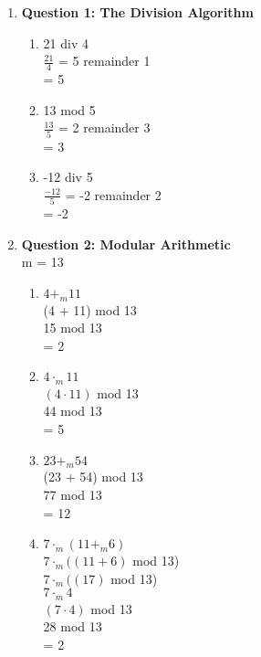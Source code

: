 \documentclass[11pt]{article}
\begin{document}
\begin{enumerate}
\item
\textbf{Question 1: The Division Algorithm} %
\begin{enumerate}[label=(\alph*)]
\item %
21 div 4 \\
$\frac{21}{4}$ = 5 remainder 1 \\
= 5 \\

\item %
13 mod 5 \\ 
$\frac{13}{5}$ = 2 remainder 3 \\
= 3 \\

\item %
-12 div 5 \\ 
$\frac{-12}{5}$ = -2 remainder 2 \\
= -2 \\

\end{enumerate}

\item
\textbf{Question 2: Modular Arithmetic} \\ %
m = 13
\begin{enumerate}[label=(\alph*)]
\item %
$4 +_{m} 11$ \\
(4 + 11) mod 13 \\
15 mod 13 \\
= 2 \\

\item %
$4 \cdot_{m} 11$ \\
$(4 \cdot 11)$ mod 13 \\
44 mod 13 \\
= 5 \\

\item %
$23 +_{m} 54$ \\
(23 + 54) mod 13 \\
77 mod 13 \\
= 12 \\

\item %
$7 \cdot_{m} (11 +_{m} 6)$ \\
$7 \cdot_{m} ((11 + 6)$ mod 13) \\
$7 \cdot_{m} ((17)$ mod 13) \\
$7 \cdot_{m} 4$ \\
$(7 \cdot 4)$ mod 13 \\
28 mod 13 \\
= 2 \\


\end{enumerate}
\end{enumerate}
\end{document}
